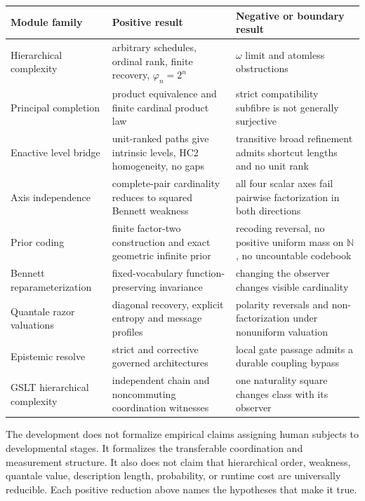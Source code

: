 \documentclass[11pt]{article}
\theoremstyle{remark}
\begin{document}
\begin{center}
\small
\begin{tabular}{>{\raggedright\arraybackslash}p{}
                >{\raggedright\arraybackslash}p{}
                >{\raggedright\arraybackslash}p{}}
\toprule
Module family & Positive result & Negative or boundary result \\
\midrule
Hierarchical complexity
  & arbitrary schedules, ordinal rank, finite recovery, $\varphi_n=2^n$
  & $\omega$ limit and atomless obstructions \\
Principal completion
  & product equivalence and finite cardinal product law
  & strict compatibility subfibre is not generally surjective \\
Enactive level bridge
  & unit-ranked paths give intrinsic levels, HC2 homogeneity, no gaps
  & transitive broad refinement admits shortcut lengths and no unit rank \\
Axis independence
  & complete-pair cardinality reduces to squared Bennett weakness
  & all four scalar axes fail pairwise factorization in both directions \\
Prior coding
  & finite factor-two construction and exact geometric infinite prior
  & recoding reversal, no positive uniform mass on $\mathbb N$, no uncountable codebook \\
Bennett reparameterization
  & fixed-vocabulary function-preserving invariance
  & changing the observer changes visible cardinality \\
Quantale razor valuations
  & diagonal recovery, explicit entropy and message profiles
  & polarity reversals and non-factorization under nonuniform valuation \\
Epistemic resolve
  & strict and corrective governed architectures
  & local gate passage admits a durable coupling bypass \\
GSLT hierarchical complexity
  & independent chain and noncommuting coordination witnesses
  & one naturality square changes class with its observer \\
\bottomrule
\end{tabular}
\end{center}

The development does not formalize empirical claims assigning human subjects
to developmental stages.  It formalizes the transferable coordination and
measurement structure.  It also does not claim that hierarchical order,
weakness, quantale value, description length, probability, or runtime cost are
universally reducible.  Each positive reduction above names the hypotheses that
make it true.
\end{document}
